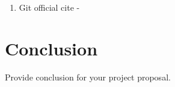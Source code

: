 \documentclass[12pt, a4paper]{report}
\begin{document}
\begin{enumerate}
  \item Git official cite - \url{}
\end{enumerate}



\chapter{Conclusion} %
\label{cha:conclusion}
Provide conclusion for your project proposal.

\printbibliography
\end{document}
